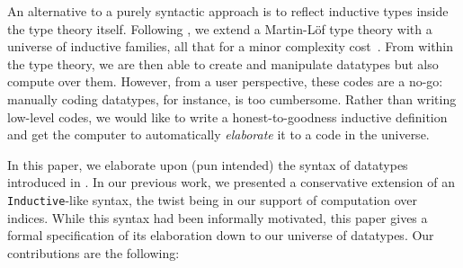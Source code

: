 \documentclass{scrartcl}
\theoremstyle{plain}
\theoremstyle{definition}
\begin{document}
An alternative to a purely syntactic approach is to reflect inductive
types inside the type theory itself. Following
\citet{benke:universe-generic-prog}, we extend a Martin-L\"{o}f type
theory with a universe of inductive families, all that for a minor
complexity cost~\citep{dagand:levitation}. From within the type
theory, we are then able to create and manipulate datatypes but also
compute over them. However, from a user perspective, these codes are a
no-go: manually coding datatypes, for instance, is too cumbersome. Rather
than writing low-level codes, we would like to write a
honest-to-goodness inductive definition and get the computer to
automatically \emph{elaborate} it to a code in the universe.



In this paper, we elaborate upon (pun intended) the syntax of
datatypes introduced in \citet{dagand:fun-orn}. In our previous work,
we presented a conservative extension of an \texttt{Inductive}-like
syntax, the twist being in our support of computation over
indices. While this syntax had been informally motivated, this paper
gives a formal specification of its elaboration down to our universe
of datatypes. Our contributions are the following:
\end{document}

